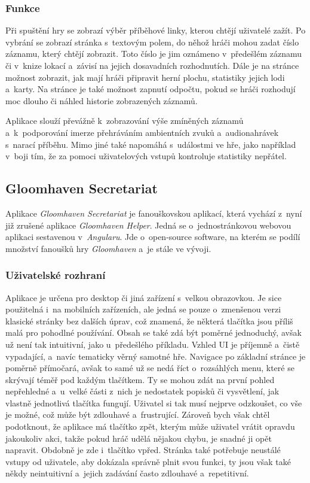 \subsubsection*{Funkce}
Při spuštění hry se zobrazí výběr příběhové linky, kterou chtějí uživatelé zažít. Po vybrání se zobrazí stránka s~textovým polem, do něhož hráči mohou zadat číslo záznamu, který chtějí zobrazit. Toto číslo je jim oznámeno v~předešlém záznamu či v~knize lokací a~závisí na jejich dosavadních rozhodnutích. Dále je na stránce možnost zobrazit, jak mají hráči připravit herní plochu, statistiky jejich lodi a~karty. Na stránce je také možnost zapnutí odpočtu, pokud se hráči rozhodují moc dlouho či náhled historie zobrazených záznamů.

Aplikace slouží převážně k~zobrazování výše zmíněných záznamů a~k~podporování imerze přehráváním ambientních zvuků a~audionahrávek s~narací příběhu. Mimo jiné také napomáhá s~událostmi ve hře, jako například v~boji tím, že za pomoci uživatelových vstupů kontroluje statistiky nepřátel.

\subsection{Gloomhaven Secretariat}
Aplikace \textit{Gloomhaven Secretariat} je fanouškovskou aplikací, která vychází z~nyní již zrušené aplikace \textit{Gloomhaven Helper}. Jedná se o~jednostránkovou webovou aplikaci sestavenou v~\textit{Angularu}. Jde o~open-source software, na kterém se podílí množství fanoušků hry \textit{Gloomhaven} a~je stále ve vývoji. \cite{gloomhaven_secretariat_github}

\subsubsection*{Uživatelské rozhraní}
Aplikace je určena pro desktop či jiná zařízení s~velkou obrazovkou. Je sice použitelná i~na mobilních zařízeních, ale jedná se pouze o~zmenšenou verzi klasické stránky bez dalších úprav, což znamená, že některá tlačítka jsou příliš malá pro pohodlné používání. Obsah se také zdá být poměrné jednoduchý, avšak už není tak intuitivní, jako u~předešlého příkladu. Vzhled UI je příjemně a~čistě vypadající, a~navíc tematicky věrný samotné hře. Navigace po základní stránce je poměrně přímočará, avšak to samé už se nedá říct o~rozsáhlých menu, které se skrývají téměř pod každým tlačítkem. Ty se mohou zdát na první pohled nepřehledné a~u~velké části z~nich je nedostatek popisků či vysvětlení, jak vlastně jednotlivá tlačítka fungují. Uživatel si tak musí nejprve odzkoušet, co vše je možné, což může být zdlouhavé a~frustrující. Zároveň bych však chtěl podotknout, že aplikace má tlačítko zpět, kterým může uživatel vrátit opravdu jakoukoliv akci, takže pokud hráč udělá nějakou chybu, je snadné ji opět napravit. Obdobně je zde i~tlačítko vpřed. Stránka také potřebuje neustálé vstupy od uživatele, aby dokázala správně plnit svou funkci, ty jsou však také někdy neintuitivní a~jejich zadávání často zdlouhavé a~repetitivní.

